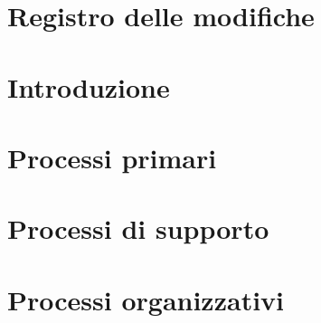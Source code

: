 \documentclass[a4paper, oneside, openany, dvipsnames, table]{article}
\begin{document}
\copertina{}

\section*{Registro delle modifiche}\label{sec:Registro-modifiche}


\newpage
\tableofcontents

\newpage
\listoftables

\newpage
\listoffigures

\newpage
\section{Introduzione}\label{sec:introduzione}


\newpage
\section{Processi primari}\label{sec:processi-primari}


\newpage
\section{Processi di supporto}\label{sec:processi-di-supporto}


\newpage
\section{Processi organizzativi}\label{sec:processi-organizzativi}

\end{document}
